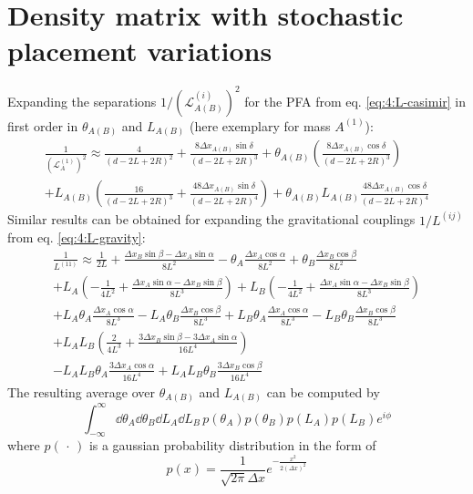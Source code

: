 \section{Density matrix with stochastic placement variations}\label{apx:placement-average-density-matrix}
Expanding the separations $1/(\mathscr{L}^{(i)}_{A(B)})^2$ for the PFA from eq. \eqref{eq:4:L-casimir} in first order in $\theta_{A(B)}$ and $L_{A(B)}$ (here exemplary for mass $A^{(1)}$):
\begin{multline}
  \frac{1}{\left(\mathscr{L}^{(1)}_{A}\right)^2} \approx \frac{4}{(d-2L+2R)^2} + \frac{8 \Delta x_{A(B)}\sin\delta}{(d-2L+2R)^3}
  + \theta_{A(B)}\left(\frac{8\Delta x_{A(B)} \cos\delta}{(d-2L+2R)^3}\right) \\
  + L_{A(B)}\left(\frac{16}{(d-2L+2R)^3} + \frac{48\Delta x_{A(B)} \sin\delta}{(d-2L+2R)^4}\right) + \theta_{A(B)}L_{A(B)}\frac{48\Delta x_{A(B)} \cos\delta}{(d-2L+2R)^4}
\end{multline}
Similar results can be obtained for expanding the gravitational couplings $1/L^{(ij)}$ from eq. \eqref{eq:4:L-gravity}:
\begin{multline}
  \frac{1}{L^{(11)}} \approx \frac{1}{2L} + \frac{\Delta x_B \sin\beta - \Delta x_A \sin\alpha}{8L^2} - \theta_A\frac{\Delta x_A\cos\alpha}{8L^2} + \theta_B\frac{\Delta x_B\cos\beta}{8L^2} \\
  + L_A \left(-\frac{1}{4L^2} + \frac{\Delta x_A \sin\alpha-\Delta x_B \sin\beta}{8L^3}\right)
  + L_B \left(-\frac{1}{4L^2} + \frac{\Delta x_A \sin\alpha-\Delta x_B \sin\beta}{8L^3}\right) \\
  + L_A \theta_A \frac{\Delta x_A \cos\alpha}{8L^3} - L_A \theta_B \frac{\Delta x_B \cos\beta}{8L^3}
  + L_B \theta_A \frac{\Delta x_A \cos\alpha}{8L^3} - L_B \theta_B \frac{\Delta x_B \cos\beta}{8L^3} \\
  + L_A L_B \left(\frac{2}{4L^3} + \frac{3\Delta x_B \sin\beta - 3 \Delta x_A \sin\alpha}{16L^4}\right) \\
  - L_A L_B \theta_A \frac{3 \Delta x_A \cos\alpha}{16L^4} + L_A L_B \theta_B \frac{3 \Delta x_B \cos\beta}{16L^4}
\end{multline}
The resulting average over $\theta_{A(B)}$ and $L_{A(B)}$ can be computed by
\begin{equation}
  \int_{-\infty}^{\infty} \dd \theta_A \dd \theta_B \dd L_A \dd L_B \, p(\theta_A) p(\theta_B) p(L_A) p(L_B) e^{i \phi}
\end{equation}
where $p(\,\cdot\,)$ is a gaussian probability distribution in the form of
\begin{equation}
  p(x) = \frac{1}{\sqrt{2\pi}\Delta x} e^{-\frac{x^2}{2(\Delta x)^2}}
\end{equation}
